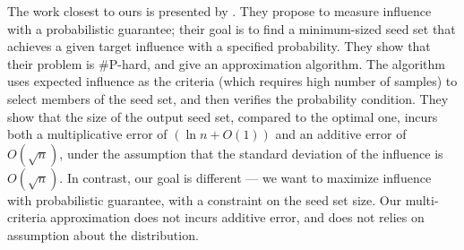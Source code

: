 The work closest to ours is presented by \cite{zhang:kdd14}. They
propose to measure influence with a probabilistic guarantee; their  goal is to find a minimum-sized seed set   that achieves a given
target influence with a specified probability. They show that their problem is \#P-hard, and give an
approximation algorithm. The algorithm uses expected influence as the criteria (which requires high number of samples) to select
members of the seed set, and then verifies the probability condition.
They show that the size of the output seed set, compared to the
optimal one, incurs both a multiplicative error of $(\ln n + O(1))$ and an additive error
of $O(\sqrt{n})$, under the assumption that the standard deviation of the influence is
$O(\sqrt{n})$. In contrast, our goal is different ---
we want to maximize influence with probabilistic guarantee, with a constraint on the seed set
size. Our multi-criteria approximation does not incurs additive error, and does not relies
on assumption about the distribution.
